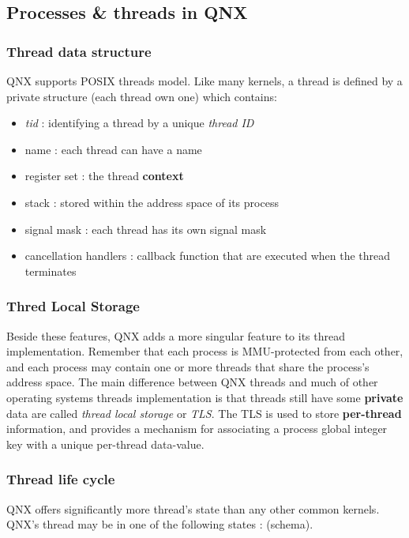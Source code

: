 \subsection{Processes \& threads in QNX}


\begin{frame}
\frametitle{Thread data structure}

QNX supports POSIX threads model. Like many kernels, a thread is defined by a private structure (each thread own one) which contains:

\-

\begin{itemize}
\item
\textit{tid} : identifying a thread by a unique \textit{thread ID}
\item
name : each thread can have a name
\item
register set : the thread \textbf{context}
\item
stack : stored within the address space of its process
\item
signal mask : each thread has its own signal mask
\item
cancellation handlers : callback function that are executed when the thread terminates
\end{itemize}

\end{frame}


\begin{frame}
\frametitle{Thred Local Storage}

Beside these features, QNX adds a more singular feature to its thread implementation. Remember that each process is MMU-protected from each other, and each process may contain one or more threads that share the process's address space. The main difference between QNX threads and much of other operating systems threads implementation is that threads still have some \textbf{private} data are called \textit{thread local storage} or \textit{TLS}. The TLS is used to store \textbf{per-thread} information, and provides a mechanism for associating a process global integer key with a unique per-thread data-value.

\end{frame}


\begin{frame}
\frametitle{Thread life cycle}

QNX offers significantly more thread's state than any other common kernels. QNX's thread may be in one of the following states : (schema).

\end{frame}



